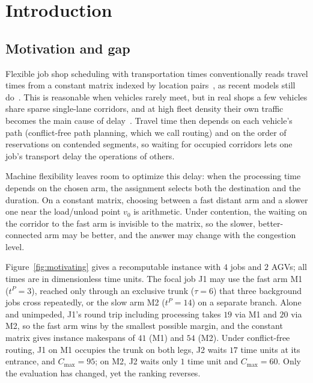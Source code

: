 \documentclass[manuscript,screen,review]{acmart}
\begin{document}
\section{Introduction}
\label{sec:Chapter_I}

\subsection{Motivation and gap}

Flexible job shop scheduling with transportation times conventionally reads travel times from a constant matrix indexed by location pairs~\cite{xin2025review}, as recent models still do~\cite{meng2025cp,qin2026knowledge,jafarian2026integrated}.
This is reasonable when vehicles rarely meet, but in real shops a few vehicles share sparse single-lane corridors, and at high fleet density their own traffic becomes the main cause of delay~\cite{kim2026congestion}.
Travel time then depends on each vehicle's path (conflict-free path planning, which we call routing) and on the order of reservations on contended segments, so waiting for occupied corridors lets one job's transport delay the operations of others.

Machine flexibility leaves room to optimize this delay: when the processing time depends on the chosen arm, the assignment selects both the destination and the duration.
On a constant matrix, choosing between a fast distant arm and a slower one near the load/unload point $v_0$ is arithmetic.
Under contention, the waiting on the corridor to the fast arm is invisible to the matrix, so the slower, better-connected arm may be better, and the answer may change with the congestion level.

Figure~\ref{fig:motivating} gives a recomputable instance with $4$ jobs and $2$ AGVs; all times are in dimensionless time units.
The focal job J1 may use the fast arm M1 ($t^P=3$), reached only through an exclusive trunk ($\tau=6$) that three background jobs cross repeatedly, or the slow arm M2 ($t^P=14$) on a separate branch.
Alone and unimpeded, J1's round trip including processing takes $19$ via M1 and $20$ via M2, so the fast arm wins by the smallest possible margin, and the constant matrix gives instance makespans of $41$ (M1) and $54$ (M2).
Under conflict-free routing, J1 on M1 occupies the trunk on both legs, J2 waits $17$ time units at its entrance, and $C_{\max}=95$; on M2, J2 waits only $1$ time unit and $C_{\max}=60$.
Only the evaluation has changed, yet the ranking reverses.
\end{document}
